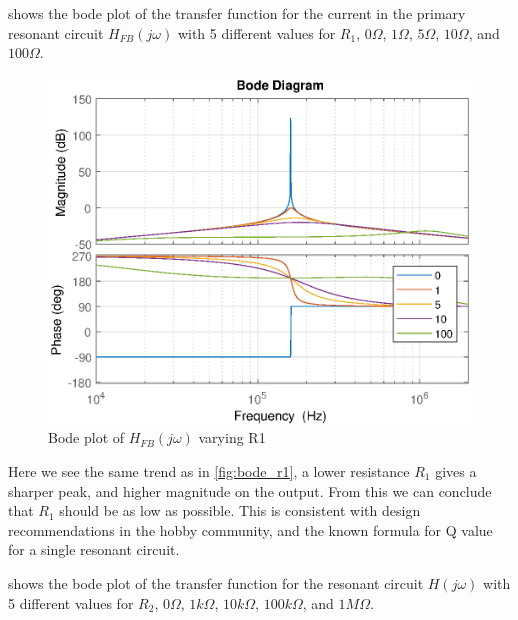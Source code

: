 \newpage
{} shows the bode plot of the transfer function for the current in the primary resonant circuit $H_{FB}(j\omega)$ with 5 different values for $R_1$, $0\Omega$, $1\Omega$, $5\Omega$, $10\Omega$, and $100\Omega$.
\begin{figure}[H]
    \centering
    \includegraphics[width=\textwidth]{img/FeedBackBode_R1.eps}
    \caption{Bode plot of $H_{FB}(j\omega)$ varying R1}
    \label{fig:fbbode_r1}
\end{figure}

Here we see the same trend as in \cref{fig:bode_r1}, a lower resistance $R_1$ gives a sharper peak, and higher magnitude on the output. From this we can conclude that $R_1$ should be as low as possible. This is consistent with design recommendations in the hobby community, and the known formula for Q value for a single resonant circuit.

\newpage
{} shows the bode plot of the transfer function for the resonant circuit $H(j\omega)$ with 5 different values for $R_2$, $0\Omega$, $1k\Omega$, $10k\Omega$, $100k\Omega$, and $1M\Omega$.

